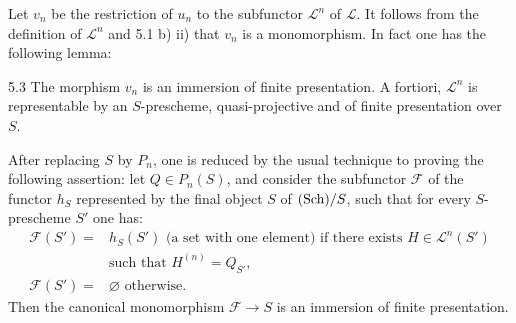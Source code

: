 Let $v_n$ be the restriction of $u_n$ to the subfunctor $\mathscr L^n$ of $\mathscr L$. It follows from the definition of $\mathscr L^n$ and 5.1 b) ii) that $v_n$ is a monomorphism. In fact one has the following lemma:
\begin{lemma}{5.3}\label{XV.5.3}
The morphism $v_n$ is an immersion of finite presentation. A fortiori, $\mathscr L^n$ is representable by an $S$-prescheme, quasi-projective and of finite presentation over $S$.
\end{lemma}
After replacing $S$ by $P_n$, one is reduced by the usual technique to proving the following assertion: let $Q\in P_n(S)$, and consider the subfunctor $\mathscr F$ of the functor $h_S$ represented by the final object $S$ of $\textup{(Sch)}/S$, such that for every $S$-prescheme $S'$ one has:
\[
\begin{aligned}
\mathscr F(S')={}&h_S(S')\text{ (a set with one element) if there exists }H\in\mathscr L^n(S')\\
&\text{such that }H^{(n)}=Q_{S'},\\
\mathscr F(S')={}&\varnothing\text{ otherwise.}
\end{aligned}
\]
Then the canonical monomorphism $\mathscr F\to S$ is an immersion of finite presentation.

